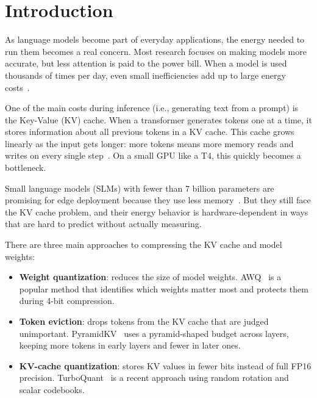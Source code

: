 \documentclass[sigconf,nonacm]{acmart}
\begin{document}

\maketitle

\section{Introduction}

As language models become part of everyday applications, the energy needed to run
them becomes a real concern. Most research focuses on making models more accurate,
but less attention is paid to the power bill. When a model is used thousands of
times per day, even small inefficiencies add up to large energy costs~\cite{strubell_energy_2019,patterson_carbon_nodate,schwartz2020green}.

One of the main costs during inference (i.e., generating text from a prompt) is
the Key-Value (KV) cache. When a transformer generates tokens one at a time, it
stores information about all previous tokens in a KV cache. This cache grows
linearly as the input gets longer: more tokens means more memory reads and writes
on every single step~\cite{li2024survey}. On a small GPU like a T4, this quickly
becomes a bottleneck.

Small language models (SLMs) with fewer than 7 billion parameters are promising
for edge deployment because they use less memory~\cite{husom_sustainable_2025}.
But they still face the KV cache problem, and their energy behavior is
hardware-dependent in ways that are hard to predict without actually measuring.

There are three main approaches to compressing the KV cache and model weights:
\begin{itemize}
  \item \textbf{Weight quantization}: reduces the size of model weights.
    AWQ~\cite{lin_awq_2025} is a popular method that identifies which weights
    matter most and protects them during 4-bit compression.
  \item \textbf{Token eviction}: drops tokens from the KV cache that are judged
    unimportant. PyramidKV~\cite{cai_pyramidkv_2025} uses a pyramid-shaped budget
    across layers, keeping more tokens in early layers and fewer in later ones.
  \item \textbf{KV-cache quantization}: stores KV values in fewer bits instead of
    full FP16 precision. TurboQuant~\cite{zandieh_turboquant_2025} is a recent
    approach using random rotation and scalar codebooks.
\end{itemize}
\end{document}
